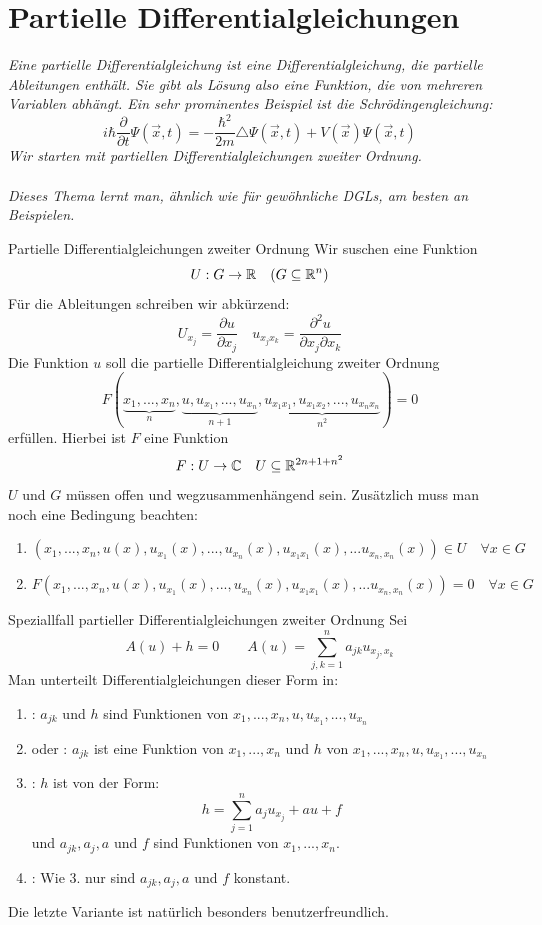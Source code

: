 \newpage
\section[Partielle Differentialgleichungen]{Partielle Differentialgleichungen}
\textit{Eine partielle Differentialgleichung ist eine Differentialgleichung, die partielle Ableitungen enthält. Sie gibt als Lösung also eine Funktion, die von mehreren Variablen abhängt. Ein sehr prominentes Beispiel ist die Schrödingengleichung:
$$i\hbar\frac{\partial}{\partial t}\Psi(\vec{x},t)=-\frac{\hbar^2}{2m}\triangle \Psi(\vec{x},t)+V(\vec{x})\Psi(\vec{x},t)$$
Wir starten mit partiellen Differentialgleichungen zweiter Ordnung. \\ \\
Dieses Thema lernt man, ähnlich wie für gewöhnliche DGLs, am besten an Beispielen.}
\begin{Def}{Partielle Differentialgleichungen zweiter Ordnung}
Wir suschen eine Funktion
$$U:G\rightarrow \mathbb{R} \quad (G\subseteq \mathbb{R}^n)$$
Für die Ableitungen schreiben wir abkürzend:
$$U_{x_j}=\frac{\partial u}{\partial x_j}\quad u_{x_jx_k}=\frac{\partial^2 u}{\partial x_j \partial x_k}$$
Die Funktion $u$ soll die partielle Differentialgleichung zweiter Ordnung
$$F(\underbrace{x_1,...,x_n}_n,\underbrace{u, u_{x_1},...,u_{x_n}}_{n+1}, \underbrace{u_{x_1x_1}, u_{x_1x_2},...,u_{x_nx_n}}_{n^2})=0$$
erfüllen. Hierbei ist $F$ eine Funktion
$$F: U\rightarrow \mathbb{C} \quad U\subseteq \mathbb{R}^{2n+1+n^2}$$
$U$ und $G$ müssen offen und wegzusammenhängend sein. Zusätzlich muss man noch eine Bedingung beachten:
\begin{enumerate}
    \item $(x_1,...,x_n, u(x), u_{x_1}(x),...,u_{x_n}(x), u_{x_1x_1}(x),...u_{x_n,x_n}(x))\in U \quad \forall x\in G$
    \item $F(x_1,...,x_n, u(x), u_{x_1}(x),...,u_{x_n}(x), u_{x_1x_1}(x),...u_{x_n,x_n}(x))=0 \quad \forall x\in G$
\end{enumerate}
\end{Def}
\begin{Def}{Speziallfall partieller Differentialgleichungen zweiter Ordnung}
Sei
$$A(u)+h=0 \qquad A(u)=\sum_{j,k=1}^n a_{jk}u_{x_j,x_k}$$
Man unterteilt Differentialgleichungen dieser Form in:
\begin{enumerate}
    \item {}: $a_{jk}$ und $h$ sind Funktionen von $x_1,...,x_n, u, u_{x_1},...,u_{x_n}$
    \item {} oder : $a_{jk}$ ist eine Funktion von $x_1,...,x_n$ und $h$ von $x_1,...,x_n, u, u_{x_1},...,u_{x_n}$
    \item {}: $h$ ist von der Form:
    $$h=\sum_{j=1}^n a_ju_{x_j}+au+f$$
    und $a_{jk}, a_j, a$ und $f$ sind Funktionen von $x_1, ..., x_n$.
    \item {}: Wie 3. nur sind $a_{jk}, a_j, a$ und $f$ konstant.
\end{enumerate}
\end{Def}
Die letzte Variante ist natürlich besonders benutzerfreundlich.

